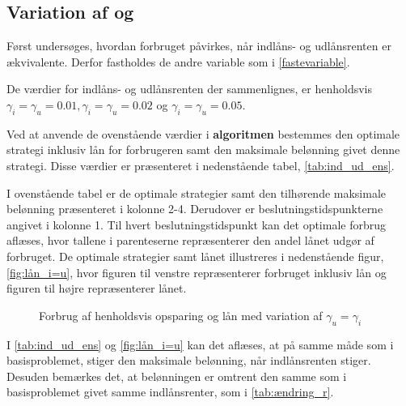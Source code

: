 \subsection[Variation af  \texorpdfstring{$\gamma_i$ og $\gamma_u$}{Variation af indlåns- og udlånsrenten}]{Variation af  og }
Først undersøges, hvordan forbruget påvirkes, når indlåns- og udlånsrenten er ækvivalente. Derfor fastholdes de andre variable som i \eqref{fastevariable}.

De værdier for indlåns- og udlånsrenten der sammenlignes, er henholdsvis $\gamma_i = \gamma_u= 0.01, \gamma_i = \gamma_u=0.02$ og $\gamma_i = \gamma_u=0.05$.

Ved at anvende de ovenstående værdier i \textbf{algoritmen} bestemmes den optimale strategi inklusiv lån for forbrugeren samt den maksimale belønning givet denne strategi. Disse værdier er præsenteret i nedenstående tabel, \autoref{tab:ind_ud_ens}.



I ovenstående tabel er de optimale strategier samt den tilhørende maksimale belønning præsenteret i kolonne 2-4. Derudover er beslutningstidspunkterne angivet i kolonne 1. Til hvert beslutningstidspunkt kan det optimale forbrug aflæses, hvor tallene i parenteserne repræsenterer den andel lånet udgør af forbruget. De optimale strategier samt lånet illustreres i nedenstående figur, \autoref{fig:lån_i=u}, hvor figuren til venstre repræsenterer forbruget inklusiv lån og figuren til højre repræsenterer lånet. 

\begin{figure}[H] 
    \begin{center}
        \resizebox{8cm}{!}{}
        \resizebox{8cm}{!}{}
    \end{center}
    \caption{Forbrug af henholdsvis opsparing og lån med variation af $\gamma_u=\gamma_i$}\label{fig:lån_i=u}
\end{figure}


I \autoref{tab:ind_ud_ens} og \autoref{fig:lån_i=u} kan det aflæses, at på samme måde som i basisproblemet, stiger den maksimale belønning, når indlånsrenten stiger. Desuden bemærkes det, at belønningen er omtrent den samme som i basisproblemet givet samme indlånsrenter, som i \autoref{tab:ændring_r}. 


